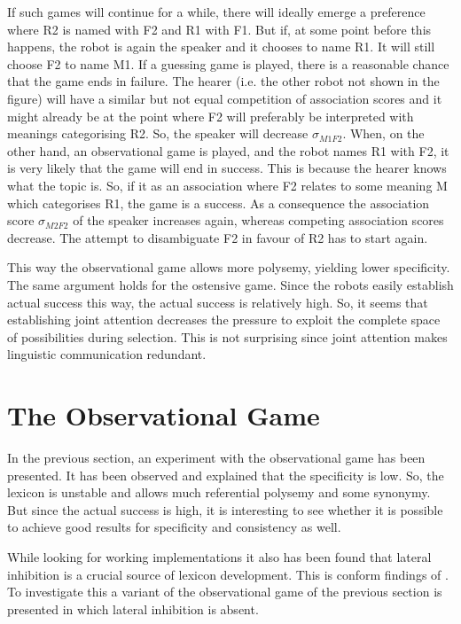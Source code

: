If such games will continue for a while, there will ideally emerge a preference where R2 is named with F2 and R1 with F1. But if, at some point before this happens, the robot is again the speaker and it chooses to name R1. It will still choose F2 to name M1.  If a guessing game is played, there is a reasonable chance that the game ends in failure. The hearer (i.e. the other robot not shown in the figure) will have a similar but not equal competition of association scores and it might already be at the point where F2 will preferably be interpreted with meanings categorising R2. So, the speaker will decrease $\sigma_{M1F2}$. When, on the other hand, an observational game is played, and the robot names R1 with F2, it is very likely that the game will end in success. This is because the hearer knows what the topic is. So, if it as an association where F2 relates to some meaning M which categorises R1, the game is a success. As a consequence the association score $\sigma_{M2F2}$ of the speaker increases again, whereas competing association scores decrease. The attempt to disambiguate F2 in favour of R2 has to start again.

This way the observational game allows more polysemy, yielding lower specificity. The same argument holds for the ostensive game. Since the robots easily establish actual success this way, the actual success is relatively high. So, it seems that establishing joint attention decreases the pressure to exploit the complete space of possibilities during selection. This is not surprising since joint attention makes linguistic communication redundant.


\section{The Observational Game}\label{s:par:observ}\label{s:feed:oli}

In the previous section, an experiment with the observational game has been presented. It has been observed and explained that the specificity is low. So, the lexicon is unstable and allows much referential polysemy and some synonymy. But since the actual success is high, it is interesting to see whether it is possible to achieve good results for specificity and consistency as well. 

While looking for working implementations it also has been found that lateral inhibition is a crucial source of lexicon development. This is conform findings of \citep{oliphant:1997,steels:2000,dejong:2000,kaplan:2000}. To investigate this a variant of the observational game of the previous section is presented in which lateral inhibition is absent.


